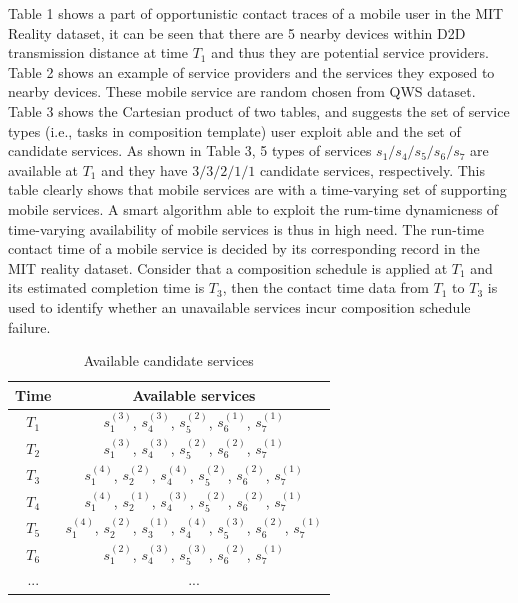 \documentclass[journal]{IEEEtran}
\begin{document}
Table 1 shows a part of opportunistic contact traces of a mobile user in the MIT Reality dataset, it can be seen that there are 5 nearby devices within D2D transmission distance at time $T_1$ and thus they are potential service providers. Table 2 shows an example of service providers and the services they exposed to nearby devices. These mobile service are random chosen from QWS dataset. Table 3 shows the Cartesian product of two tables, and suggests the set of service types (i.e., tasks in composition template) user exploit able and the set of candidate services. 
As shown in Table 3, 5 types of services $s_1/s_4/s_5/s_6/s_7$ are available at $T_1$ and they have $3/3/2/1/1$ candidate services, respectively.
This table clearly shows that mobile services are with a time-varying set of supporting mobile services. 
A smart algorithm able to exploit the rum-time dynamicness of time-varying availability of mobile services is thus in high need. The run-time contact time of a mobile service is decided by its corresponding record in the MIT reality dataset. Consider that a composition schedule is applied at $T_1$ and its estimated completion time is $T_3$, then the contact time data from $T_1$ to $T_3$ is used to identify whether an unavailable services incur composition schedule failure.

\begin{table}[!t]
\renewcommand{\arraystretch}{1.8}
\caption{Available candidate services}
\label{Available candidate services}
\centering
\begin{tabular}{c c}
\hline
\bfseries Time & \bfseries Available services\\
\hline
$T_1$     & $s_1^{(3)}$, $s_4^{(3)}$, $s_5^{(2)}$, $s_6^{(1)}$, $s_7^{(1)}$ \\
$T_2$     & $s_1^{(3)}$, $s_4^{(3)}$, $s_5^{(2)}$, $s_6^{(2)}$, $s_7^{(1)}$ \\
$T_3$     & $s_1^{(4)}$, $s_2^{(2)}$, $s_4^{(4)}$, $s_5^{(2)}$, $s_6^{(2)}$, $s_7^{(1)}$ \\
$T_4$     & $s_1^{(4)}$, $s_2^{(1)}$, $s_4^{(3)}$, $s_5^{(2)}$, $s_6^{(2)}$, $s_7^{(1)}$ \\
$T_5$     & $s_1^{(4)}$, $s_2^{(2)}$, $s_3^{(1)}$, $s_4^{(4)}$, $s_5^{(3)}$, $s_6^{(2)}$, $s_7^{(1)}$ \\
$T_6$     & $s_1^{(2)}$, $s_4^{(3)}$, $s_5^{(3)}$, $s_6^{(2)}$, $s_7^{(1)}$ \\
... & ...\\
\hline
\end{tabular}
\end{table}
\end{document}
